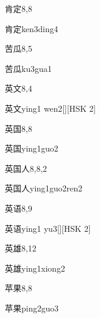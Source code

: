 \begin{entry}{肯定}{8,8}
  \begin{phonetics}{肯定}{ken3ding4}
  \end{phonetics}
\end{entry}

\begin{entry}{苦瓜}{8,5}
  \begin{phonetics}{苦瓜}{ku3gua1}
  \end{phonetics}
\end{entry}

\begin{entry}{英文}{8,4}
  \begin{phonetics}{英文}{ying1 wen2}[][HSK 2]
  \end{phonetics}
\end{entry}

\begin{entry}{英国}{8,8}
  \begin{phonetics}{英国}{ying1guo2}
  \end{phonetics}
\end{entry}

\begin{entry}{英国人}{8,8,2}
  \begin{phonetics}{英国人}{ying1guo2ren2}
  \end{phonetics}
\end{entry}

\begin{entry}{英语}{8,9}
  \begin{phonetics}{英语}{ying1 yu3}[][HSK 2]
  \end{phonetics}
\end{entry}

\begin{entry}{英雄}{8,12}
  \begin{phonetics}{英雄}{ying1xiong2}
  \end{phonetics}
\end{entry}

\begin{entry}{苹果}{8,8}
  \begin{phonetics}{苹果}{ping2guo3}
  \end{phonetics}
\end{entry}

